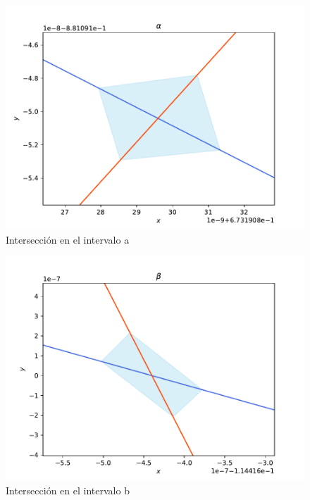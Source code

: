 \begin{figure}[H]
\centering
\includegraphics[scale=0.4]{cruce_a}
\caption{Intersección en el intervalo a}
\label{jung_corte1}
\end{figure}


\begin{figure}[H]
\centering
\includegraphics[scale=0.4]{cruce_b}
\caption{Intersección en el intervalo b}
\label{jung_corte2}
\end{figure}


